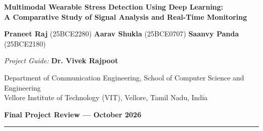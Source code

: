\documentclass[11pt,a4paper]{article}
\begin{document}
\begin{center}
    {\Large\textbf{Multimodal Wearable Stress Detection Using Deep Learning: \\[0.2cm] A Comparative Study of Signal Analysis and Real-Time Monitoring}\par}
    \vspace{0.4cm}
    {\normalsize \textbf{Praneet Raj} (25BCE2280) \quad \textbf{Aarav Shukla} (25BCE0707) \quad \textbf{Saanvy Panda} (25BCE2180)\par}
    \vspace{0.25cm}
    {\normalsize\textit{Project Guide:} \textbf{Dr. Vivek Rajpoot}\par}
    \vspace{0.15cm}
    {\small Department of Communication Engineering, School of Computer Science and Engineering\\
    Vellore Institute of Technology (VIT), Vellore, Tamil Nadu, India\par}
    \vspace{0.25cm}
    {\small\textbf{Final Project Review --- October 2026}\par}
\end{center}

\vspace{-0.2cm}
\hrule
\vspace{0.4cm}
\end{document}
